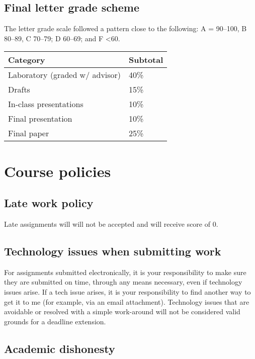 \hypertarget{final-letter-grade-scheme}{%
\subsection{Final letter grade scheme}\label{final-letter-grade-scheme}}

The letter grade scale followed a pattern close to the following: A =
90--100, B 80--89, C 70--79; D 60--69; and F \textless60.

\begin{longtable}[]{@{}ll@{}}
\toprule
Category & Subtotal\tabularnewline
\midrule
\endhead
Laboratory (graded w/ advisor) & 40\%\tabularnewline
Drafts & 15\%\tabularnewline
In-class presentations & 10\%\tabularnewline
Final presentation & 10\%\tabularnewline
Final paper & 25\%\tabularnewline
\bottomrule
\end{longtable}

\hypertarget{course-policies}{%
\section{Course policies}\label{course-policies}}

\hypertarget{late-work-policy}{%
\subsection{Late work policy}\label{late-work-policy}}

Late assignments will will not be accepted and will receive score of 0.

\hypertarget{technology-issues-when-submitting-work}{%
\subsection{Technology issues when submitting
work}\label{technology-issues-when-submitting-work}}

For assignments submitted electronically, it is your responsibility to
make sure they are submitted on time, through any means necessary, even
if technology issues arise. If a tech issue arises, it is your
responsibility to find another way to get it to me (for example, via an
email attachment). Technology issues that are avoidable or resolved with
a simple work-around will not be considered valid grounds for a deadline
extension.

\hypertarget{academic-dishonesty}{%
\subsection{Academic dishonesty}\label{academic-dishonesty}}

